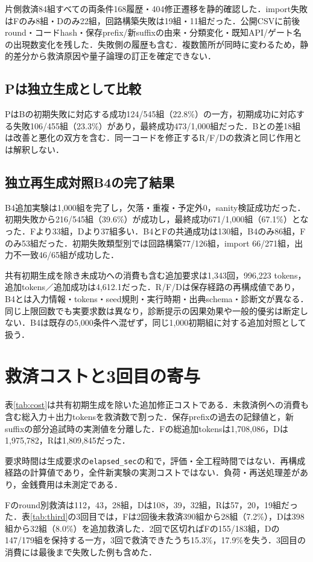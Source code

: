 \documentclass[a4paper,8pt,twocolumn]{extarticle}
\begin{document}
片側救済84組すべての両条件168履歴・404修正遷移を静的確認した．import失敗はFのみ8組・Dのみ22組，回路構築失敗は19組・11組だった．公開CSVに前後round・コードhash・保存prefix/新suffixの由来・分類変化・既知API/ゲート名の出現数変化を残した．失敗側の履歴も含む．複数箇所が同時に変わるため，静的差分から救済原因や量子論理の訂正を確定できない．

\subsection{Pは独立生成として比較}
PはBの初期失敗に対応する成功124/545組（22.8\%）の一方，初期成功に対応する失敗106/455組（23.3\%）があり，最終成功473/1,000組だった．Bとの差18組は改善と悪化の双方を含む．同一コードを修正するR/F/Dの救済と同じ作用とは解釈しない．

\subsection{独立再生成対照B4の完了結果}
B4追加実験\cite{b4data}は1,000組を完了し，欠落・重複・予定外0，sanity検証成功だった．初期失敗から216/545組（39.6\%）が成功し，最終成功671/1,000組（67.1\%）となった．Fより33組，Dより37組多い．B4とFの共通成功は130組，B4のみ86組，Fのみ53組だった．初期失敗類型別では回路構築77/126組，import 66/271組，出力不一致46/65組が成功した．

共有初期生成を除き未成功への消費も含む追加要求は1,343回，996,223 tokens，追加tokens／追加成功は4,612.1だった．R/F/Dは保存経路の再構成値であり，B4とは入力情報・tokens・seed規則・実行時期・出典schema・診断文が異なる．同じ上限回数でも実要求数は異なり，診断提示の因果効果や一般的優劣は断定しない．B4は既存の5,000条件へ混ぜず，同じ1,000初期組に対する追加対照として扱う．

\section{救済コストと3回目の寄与}
表\ref{tab:cost}は共有初期生成を除いた追加修正コストである．未救済例への消費も含む総入力＋出力tokensを救済数で割った．保存prefixの過去の記録値と，新suffixの部分追試時の実測値を分離した．Fの総追加tokensは1,708,086，Dは1,975,782，Rは1,809,845だった．

要求時間は生成要求の\texttt{elapsed\_sec}の和で，評価・全工程時間ではない．再構成経路の計算値であり，全件新実験の実測コストではない．負荷・再送処理差があり，金銭費用は未測定である．

Fのround別救済は112，43，28組，Dは108，39，32組，Rは57，20，19組だった．表\ref{tab:third}の3回目では，Fは2回後未救済390組から28組（7.2\%），Dは398組から32組（8.0\%）を追加救済した．2回で区切ればFの155/183組，Dの147/179組を保持する一方，3回で救済できたうち15.3\%，17.9\%を失う．3回目の消費には最後まで失敗した例も含めた．
\end{document}
